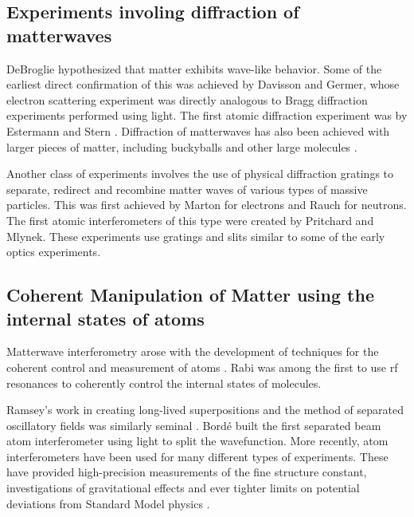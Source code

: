 \subsection{Experiments involing diffraction of matterwaves}
DeBroglie hypothesized that matter exhibits wave-like behavior. Some of the earliest direct confirmation of this was achieved by Davisson and Germer\cite{davisson_and_germer}, whose electron scattering experiment was directly analogous to Bragg diffraction experiments performed using light. The first atomic diffraction experiment was by Estermann and Stern \cite{esterman_stern}\cite{Kronin_RMP}. Diffraction of matterwaves has also been achieved with larger pieces of matter, including buckyballs\cite{C60_interferometry} and other large molecules \cite{large_molecule_interferometry}.

Another class of experiments involves the use of physical diffraction gratings to separate, redirect and recombine matter waves of various types of massive particles. This was first achieved by Marton\cite{electronGrating} for electrons and Rauch\cite{neutronGrating} for neutrons. The first atomic interferometers of this type were created by Pritchard\cite{pritchard1991} and Mlynek\cite{youngDoubleSlit_Carnal_Mlynek}. These experiments use gratings and slits similar to some of the early optics experiments. 

\subsection{Coherent Manipulation of Matter using the internal states of atoms}
Matterwave interferometry arose with the development of techniques for the coherent control and measurement of atoms \cite{Kronin_RMP}. Rabi was among the first to use rf resonances to coherently control the internal states of molecules\cite{RabiOriginal}\cite{Kronin_RMP}. 

Ramsey's work in creating long-lived superpositions and the method of separated oscillatory fields was similarly seminal \cite{Kronin_RMP}\cite{Ramsey_original}. 
Bord\'e built \cite{borde_interferometer} the first separated beam atom interferometer using light to split the wavefunction. 
More recently, atom interferometers have been used for many different types of experiments. These have provided high-precision measurements of the fine structure constant, investigations of gravitational effects and ever tighter limits on potential deviations from Standard Model physics \cite{Kronin_RMP}.

